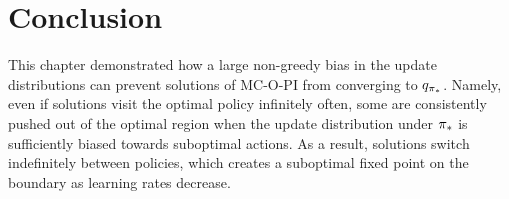 


% 




\section{Conclusion}

This chapter demonstrated how a large non-greedy bias in the update distributions can prevent solutions of MC-O-PI from converging to $q_{{\pi}_*}$.
Namely, even if solutions visit the optimal policy infinitely often, some are consistently pushed out of the optimal region when the update distribution under ${\pi}_*$ is sufficiently biased towards suboptimal actions. As a result, solutions switch indefinitely between policies, which creates a suboptimal fixed point on the boundary as learning rates decrease.



